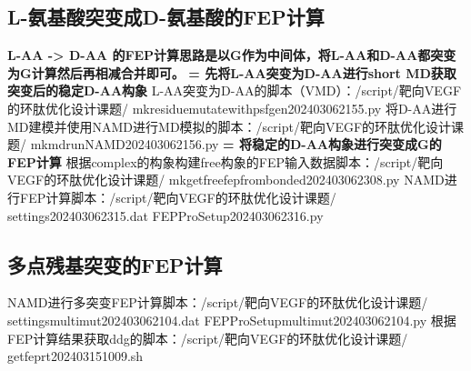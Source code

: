 \subsection{L-氨基酸突变成D-氨基酸的FEP计算}
\indent\textbf{L-AA -> D-AA 的FEP计算思路是以G作为中间体，将L-AA和D-AA都突变为G计算然后再相减合并即可。}
\newline\textbf{= 先将L-AA突变为D-AA进行short MD获取突变后的稳定D-AA构象}
\newline\indent L-AA突变为D-AA的脚本（VMD）：/script/靶向VEGF的环肽优化设计课题/ mkresiduemutatewithpsfgen202403062155.py
\newline\indent 将D-AA进行MD建模并使用NAMD进行MD模拟的脚本：/script/靶向VEGF的环肽优化设计课题/ mkmdrunNAMD202403062156.py
\newline\textbf{= 将稳定的D-AA构象进行突变成G的FEP计算}
\newline\indent 根据complex的构象构建free构象的FEP输入数据脚本：/script/靶向VEGF的环肽优化设计课题/ mkgetfreefepfrombonded202403062308.py
\newline\indent NAMD进行FEP计算脚本：/script/靶向VEGF的环肽优化设计课题/ settings202403062315.dat FEPProSetup202403062316.py
\subsection{多点残基突变的FEP计算}
\indent NAMD进行多突变FEP计算脚本：/script/靶向VEGF的环肽优化设计课题/ settingsmultimut202403062104.dat FEPProSetupmultimut202403062104.py
\newline\indent 根据FEP计算结果获取ddg的脚本：/script/靶向VEGF的环肽优化设计课题/ getfeprt202403151009.sh
